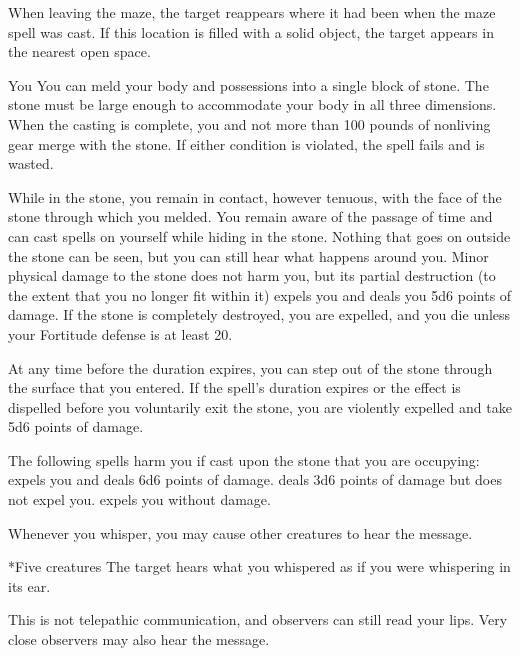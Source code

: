 When leaving the maze, the target reappears where it had been when the maze spell was cast. If this location is filled with a solid object, the target appears in the nearest open space.

\norepeatnotes

\spelldur{\durlong}
\begin{spelltarget}{You}
    \spelleffect You can meld your body and possessions into a single block of stone. The stone must be large enough to accommodate your body in all three dimensions. When the casting is complete, you and not more than 100 pounds of nonliving gear merge with the stone. If either condition is violated, the spell fails and is wasted.
    \par While in the stone, you remain in contact, however tenuous, with the face of the stone through which you melded. You remain aware of the passage of time and can cast spells on yourself while hiding in the stone. Nothing that goes on outside the stone can be seen, but you can still hear what happens around you. Minor physical damage to the stone does not harm you, but its partial destruction (to the extent that you no longer fit within it) expels you and deals you 5d6 points of damage. If the stone is completely destroyed, you are expelled, and you die unless your Fortitude defense is at least 20.
    \par At any time before the duration expires, you can step out of the stone through the surface that you entered. If the spell's duration expires or the effect is dispelled before you voluntarily exit the stone, you are violently expelled and take 5d6 points of damage.
\end{spelltarget}
\spellnotes The following spells harm you if cast upon the stone that you are occupying:  expels you and deals 6d6 points of damage.  deals 3d6 points of damage but does not expel you.  expels you without damage.

\spelldur{\durlong}
\spellline
\spelleffect Whenever you whisper, you may cause other creatures to hear the message.
\spellrng{\rngmed}
\begin{spelltargets}*{Five creatures}
    \spelleffect The target hears what you whispered as if you were whispering in its ear.
\end{spelltargets}
\spellnotes This is not telepathic communication, and observers can still read your lips. Very close observers may also hear the message.

